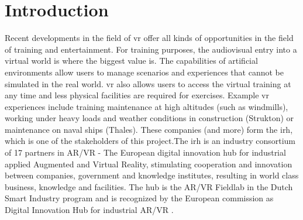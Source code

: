 \section{Introduction}
\label{sec:int}
Recent developments in the field of \acrfull{vr} offer all kinds of opportunities in the field of training
and entertainment. For training purposes, the audiovisual entry into a virtual world is where the biggest value is.
The capabilities of artificial environments allow users to manage scenarios and 
experiences that cannot be simulated in the real world. \acrshort{vr} also allows users to access the virtual training at any time
and less physical facilities are required for exercises. 
Example \acrshort{vr} experiences include training maintenance at high altitudes (such as windmills), working under heavy loads and weather conditions in construction (Strukton) or maintenance on naval ships (Thales). These companies (and more) form the \acrfull{irh}, which is one of the stakeholders of this project.The \acrshort{irh} is an industry consortium of 17 partners in AR/VR - The European digital innovation hub for industrial applied Augmented and Virtual Reality, stimulating cooperation and innovation between companies, government and knowledge institutes, resulting in world class business, knowledge and facilities. The hub is the AR/VR Fieldlab in the Dutch Smart Industry program and is recognized by the European commission as Digital Innovation Hub for industrial AR/VR \parencite{irh}.